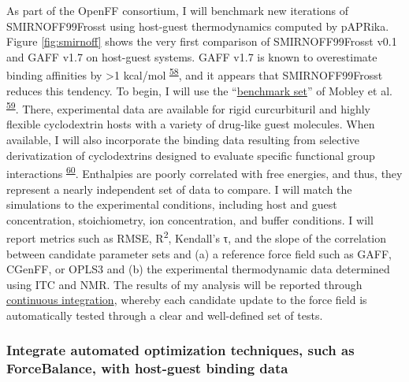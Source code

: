 \documentclass[11pt,notitlepage]{article}
\providecommand{\DIFaddbegin}{} %
\providecommand{\DIFaddend}{} %
\providecommand{\DIFdelbegin}{} %
\providecommand{\DIFdelend}{} %
\newcommand{\DIFscaledelfig}{0.5}
\newlength{\DIFdelgraphicswidth} %
\newlength{\DIFdelgraphicsheight} %
\newcommand{\DIFaddincludegraphics}[2][]{{\color{blue}\fbox{\DIFOincludegraphics[#1]{#2}}}} %
\newcommand{\DIFdelincludegraphics}[2][]{%
\sbox{\DIFdelgraphicsbox}{\DIFOincludegraphics[#1]{#2}}%
\settoboxwidth{\DIFdelgraphicswidth}{\DIFdelgraphicsbox} %
\settoboxtotalheight{\DIFdelgraphicsheight}{\DIFdelgraphicsbox} %
\scalebox{\DIFscaledelfig}{%
\parbox[b]{\DIFdelgraphicswidth}{\usebox{\DIFdelgraphicsbox}\\[-\baselineskip] \rule{\DIFdelgraphicswidth}{0em}}\llap{\resizebox{\DIFdelgraphicswidth}{\DIFdelgraphicsheight}{%
\setlength{\unitlength}{\DIFdelgraphicswidth}%
\begin{picture}(1,1)%
\thicklines\linethickness{2pt} %
{\color[rgb]{1,0,0}\put(0,0){\framebox(1,1){}}}%
{\color[rgb]{1,0,0}\put(0,0){\line( 1,1){1}}}%
{\color[rgb]{1,0,0}\put(0,1){\line(1,-1){1}}}%
\end{picture}%
}\hspace*{3pt}}} %
} %
\DeclareRobustCommand{\DIFaddbegin}{\DIFOaddbegin \let\includegraphics\DIFaddincludegraphics} %
\DeclareRobustCommand{\DIFaddend}{\DIFOaddend \let\includegraphics\DIFOincludegraphics} %
\DeclareRobustCommand{\DIFdelbegin}{\DIFOdelbegin \let\includegraphics\DIFdelincludegraphics} %
\DeclareRobustCommand{\DIFdelend}{\DIFOaddend \let\includegraphics\DIFOincludegraphics} %
\begin{document}
As part of the OpenFF consortium, I will benchmark new iterations of
SMIRNOFF99Frosst using host-guest thermodynamics computed by pAPRika.
Figure \ref{fig:smirnoff} shows the very first comparison of
SMIRNOFF99Frosst v0.1 and GAFF v1.7 on host-guest systems. GAFF v1.7 is
known to overestimate binding affinities by \textgreater{}1
kcal/mol\textsuperscript{\protect\DIFdelbegin %
\DIFdelend \DIFaddbegin \hyperlink{ref-HVgz5rZq}{58}\DIFaddend }, and it
appears that SMIRNOFF99Frosst reduces this tendency. To begin, I will
use the ``\href{https://escholarship.org/uc/item/9p37m6bq}{benchmark
set}'' of Mobley et
al.\textsuperscript{\protect\DIFdelbegin %
\DIFdelend \DIFaddbegin \hyperlink{ref-12BD3oHp4}{59}\DIFaddend }. There,
experimental data are available for rigid curcurbituril and highly
flexible cyclodextrin hosts with a variety of drug-like guest molecules.
When available, I will also incorporate the binding data resulting from
selective derivatization of cyclodextrins designed to evaluate specific
functional group
interactions\textsuperscript{\protect\DIFdelbegin %
\DIFdelend \DIFaddbegin \hyperlink{ref-13gqBX78S}{60}\DIFaddend }.
Enthalpies are poorly correlated with free energies, and thus, they
represent a nearly independent set of data to compare. I will match the
simulations to the experimental conditions, including host and guest
concentration, stoichiometry, ion concentration, and buffer conditions.
I will report metrics such as RMSE, R\textsuperscript{2}, Kendall's τ,
and the slope of the correlation between candidate parameter sets and
(a) a reference force field such as GAFF, CGenFF, or OPLS3 and (b) the
experimental thermodynamic data determined using ITC and NMR. The
results of my analysis will be reported through
\href{https://travis-ci.org/openforcefield/openforcefield?branch=master}{continuous
integration}, whereby each candidate update to the force field is
automatically tested through a clear and well-defined set of tests.

\hypertarget{integrate-automated-optimization-techniques-such-as-forcebalance-with-host-guest-binding-data}{%
\subsubsection{Integrate automated optimization techniques, such as
ForceBalance, with host-guest binding
data}\label{integrate-automated-optimization-techniques-such-as-forcebalance-with-host-guest-binding-data}}
\end{document}
